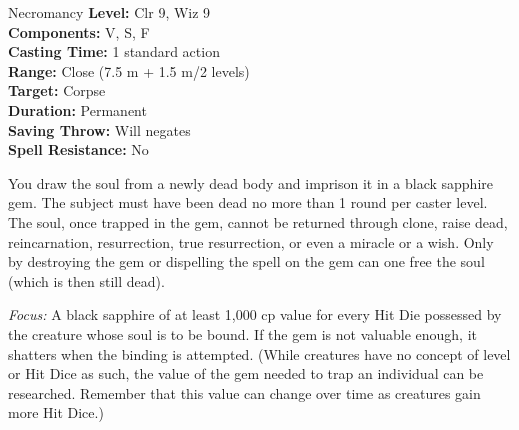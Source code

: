 {Necromancy}
{
	\textbf{Level:}
	Clr 9, Wiz 9\\
	\textbf{Components:}
	V, S, F\\
	\textbf{Casting Time:}
	1 standard action\\
	\textbf{Range:}
	Close (7.5 m + 1.5 m/2 levels)\\
	\textbf{Target:}
	Corpse\\
	\textbf{Duration:}
	Permanent\\
	\textbf{Saving Throw:}
	Will negates\\
	\textbf{Spell Resistance:}
	No\\
}
{
	You draw the soul from a newly dead body and imprison it in a black sapphire gem. The subject must have been dead no more than 1 round per caster level. The soul, once trapped in the gem, cannot be returned through clone, raise dead, reincarnation, resurrection, true resurrection, or even a miracle or a wish. Only by destroying the gem or dispelling the spell on the gem can one free the soul (which is then still dead).

	\textit{Focus:}
	A black sapphire of at least 1,000 cp value for every Hit Die possessed by the creature whose soul is to be bound. If the gem is not valuable enough, it shatters when the binding is attempted. (While creatures have no concept of level or Hit Dice as such, the value of the gem needed to trap an individual can be researched. Remember that this value can change over time as creatures gain more Hit Dice.)

}
